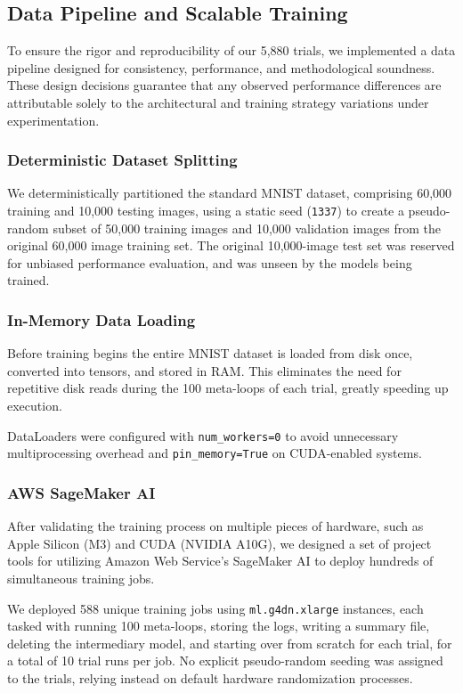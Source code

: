\documentclass[conference]{IEEEtran}
\begin{document}
\subsection{Data Pipeline and Scalable Training}

To ensure the rigor and reproducibility of our 5,880 trials, we implemented a data pipeline designed for consistency, performance, and methodological soundness. These design decisions guarantee that any observed performance differences are attributable solely to the architectural and training strategy variations under experimentation.

\subsubsection{Deterministic Dataset Splitting}

We deterministically partitioned the standard MNIST dataset, comprising 60,000 training and 10,000 testing images, using a static seed (\verb|1337|) to create a pseudo-random subset of 50,000 training images and 10,000 validation images from the original 60,000 image training set. The original 10,000-image test set was reserved for unbiased performance evaluation, and was unseen by the models being trained.

\subsubsection{In-Memory Data Loading}

Before training begins the entire MNIST dataset is loaded from disk once, converted into tensors, and stored in RAM. This eliminates the need for repetitive disk reads during the 100 meta-loops of each trial, greatly speeding up execution.

DataLoaders were configured with \texttt{num\_workers=0} to avoid unnecessary multiprocessing overhead and \texttt{pin\_memory=True} on CUDA-enabled systems.

\subsubsection{AWS SageMaker AI}

After validating the training process on multiple pieces of hardware, such as Apple Silicon (M3) and CUDA (NVIDIA A10G), we designed a set of project tools for utilizing Amazon Web Service's SageMaker AI to deploy hundreds of simultaneous training jobs.

We deployed 588 unique training jobs using \verb|ml.g4dn.xlarge| instances, each tasked with running 100 meta-loops, storing the logs, writing a summary file, deleting the intermediary model, and starting over from scratch for each trial, for a total of 10 trial runs per job. No explicit pseudo-random seeding was assigned to the trials, relying instead on default hardware randomization processes.
\end{document}
